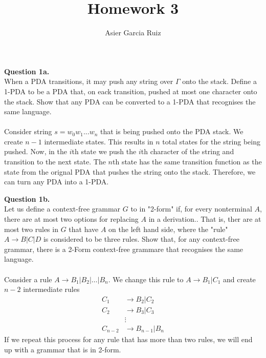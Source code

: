 \documentclass{article}
\title{Homework 3}
\author{Asier Garcia Ruiz}
\newenvironment{question}[2]
{
    {\large \textbf{Question #1.}}\\
    #2\\\\
}{\newpage}
\begin{document}
\maketitle

\begin{question}
    {1a}
    {When a PDA transitions, it may push any string over $\Gamma$ onto the stack. Define a 1-PDA to
        be a PDA that, on eack transition, pushed at most one character onto the stack. Show that any PDA
        can be converted to a 1-PDA that recognises the same language.}

    Consider string $s = w_0w_1...w_n$ that is being pushed onto the PDA stack. We create $n-1$
    intermediate states. This results in $n$ total states for the string being pushed. Now, in the
    $i$th state we push the $i$th character of the string and transition to the next state. The
    $n$th state has the same transition function as the state from the orignal PDA that pushes the
    string onto the stack. Therefore, we can turn any PDA into a 1-PDA.
\end{question}

\begin{question}
    {1b}
    {Let us define a context-free grammar $G$ to in "2-form" if, for every nonterminal $A$, there are
        at most two options for replacing $A$ in a derivation.. That is, ther are at most two rules in $G$
        that have $A$ on the left hand side, where the "rule" $A \to B|C|D$ is considered to be three rules.
        Show that, for any context-free grammar, there is a 2-Form context-free grammare that recognises
        the same language.}

    Consider a rule $A \to B_1 | B_2 | \dots | B_n$.
    We change this rule to $A \to B_1 | C_1$ and create $n - 2$ intermediate rules
    \begin{align*}
        C_1     & \to B_2 | C_2     \\
        C_2     & \to B_3 | C_3     \\
                & \vdots            \\
        C_{n-2} & \to B_{n-1} | B_n
    \end{align*}
    If we repeat this process for any rule that has more than two rules, we will end up with a grammar that
    is in 2-form.
\end{question}
\end{document}
